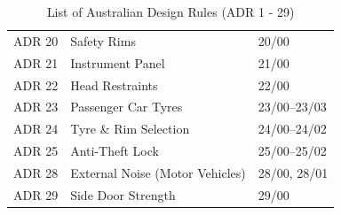 \begin{table}[h]
\begin{tabularx}{\textwidth}{|c|X|X|}
            ADR 20 & Safety Rims & 20/00 \\
            ADR 21 & Instrument Panel & 21/00 \\
            ADR 22 & Head Restraints & 22/00 \\
            ADR 23 & Passenger Car Tyres & 23/00–23/03 \\
            ADR 24 & Tyre \& Rim Selection & 24/00–24/02 \\
            ADR 25 & Anti-Theft Lock & 25/00–25/02 \\
            ADR 28 & External Noise (Motor Vehicles) & 28/00, 28/01 \\
            ADR 29 & Side Door Strength & 29/00 \\
            
            \hline
            \end{tabularx}
            \caption{List of Australian Design Rules (ADR 1 - 29)}
            \label{tab:adr1}
        \end{table}
    
    \newpage
